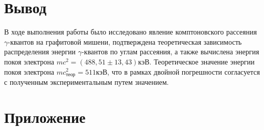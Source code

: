 \documentclass[12pt]{article}
\begin{document}
  \section{Вывод}

    В ходе выполнения работы было исследовано явление комптоновского рассеяния
    $\gamma$-квантов на графитовой мишени, подтверждена теоретическая
    зависимость распределения энергии $\gamma$-квантов по углам рассеяния, а
    также вычислена энергия покоя электрона $mc^2 = (488,51 \pm 13,43) кэВ$.
    Теоретическое значение энергии покоя электрона $mc^2_{теор} = 511 кэВ$, что
    в рамках двойной погрешности согласуется с полученным экспериментальным
    путем значением.

  \newpage
  \section{Приложение}
  \label{add:spectres}
\end{document}
